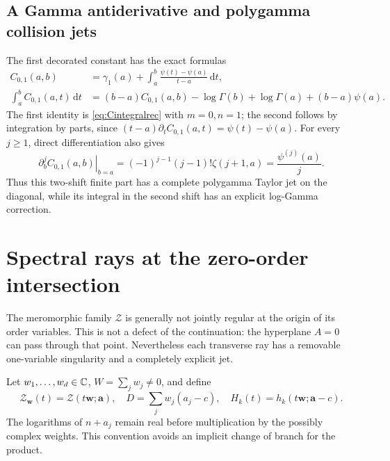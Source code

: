 \documentclass[11pt,a4paper]{article}
\numberwithin{equation}{section}
\theoremstyle{definition}\newtheorem{definition}[theorem]{Definition}
\theoremstyle{remark}\newtheorem{remark}[theorem]{Remark}
\newcommand{\dd}{\,\mathrm d}
\newcommand{\wv}{\boldsymbol w}
\begin{document}
\subsection{A Gamma antiderivative and polygamma collision jets}
The first decorated constant has the exact formulas
\begin{align}
 C_{0,1}(a,b)&=\gamma_1(a)+\int_a^b
          \frac{\psi(t)-\psi(a)}{t-a}\dd t,\label{eq:C01int}\\
 \int_a^b C_{0,1}(a,t)\dd t
   &=(b-a)C_{0,1}(a,b)-\log\Gamma(b)+\log\Gamma(a)
                                      +(b-a)\psi(a).
 \label{eq:C01primitive}
\end{align}
The first identity is \eqref{eq:Cintegralrec} with $m=0,n=1$;
the second follows by integration by parts, since
$(t-a)\partial_tC_{0,1}(a,t)=\psi(t)-\psi(a)$.
For every $j\ge1$, direct differentiation also gives
\begin{equation}
 \left.\partial_b^j C_{0,1}(a,b)\right|_{b=a}
       =(-1)^{j-1}(j-1)!\zeta(j+1,a)
       =\frac{\psi^{(j)}(a)}{j}.
 \label{eq:C01polygamma}
\end{equation}
Thus this two-shift finite part has a complete polygamma Taylor jet
on the diagonal, while its integral in the second shift has an
explicit log-Gamma correction.

\section{Spectral rays at the zero-order intersection}
\label{sec:rays}
The meromorphic family $\mathcal Z$ is generally not jointly regular
at the origin of its order variables. This is not a defect of the
continuation: the hyperplane $A=0$ can pass through that point.
Nevertheless each transverse ray has a removable one-variable
singularity and a completely explicit jet.

Let $w_1,\ldots,w_d\in\mathbb C$, $W=\sum_jw_j\ne0$, and define
\[
 \mathcal Z_{\wv}(t)=\mathcal Z(t\wv;\boldsymbol a),\quad
 D=\sum_jw_j(a_j-c),\quad H_k(t)=h_k(t\wv;\boldsymbol a-c).
\]
The logarithms of $n+a_j$ remain real before multiplication by the
possibly complex weights. This convention avoids an implicit change
of branch for the product.
\end{document}
